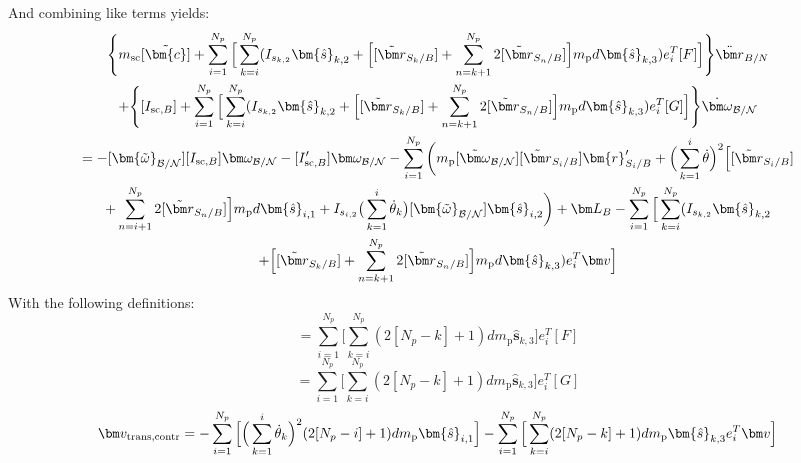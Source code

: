 And combining like terms yields:
\begin{multline}
	\Bigg \lbrace m_{\text{sc}} [\tilde{\bm{c}}] + \sum\limits_{i=1}^{N_p} \Big[\sum^{N_p}_{k=i} (I_{s_{k,2}} \bm{\hat{s}}_{k,2} + \Big[ [\tilde{{\bm r}}_{S_{k}/B}] + \sum\limits_{n=k+1}^{N_p}2[\tilde{{\bm r}}_{S_{n}/B}]\Big]m_{\text{p}} d \bm{\hat{s}}_{k,3} ) e_{i}^T[F] \Big] \Bigg \rbrace \ddot{\bm r}_{B/N} \\
	+ \Bigg \lbrace [I_{\text{sc},B}] + \sum\limits_{i=1}^{N_p} \Big[\sum^{N_p}_{k=i} (I_{s_{k,2}} \bm{\hat{s}}_{k,2} + \Big[ [\tilde{{\bm r}}_{S_{k}/B}] + \sum\limits_{n=k+1}^{N_p}2[\tilde{{\bm r}}_{S_{n}/B}]\Big]m_{\text{p}} d \bm{\hat{s}}_{k,3} ) e_{i}^T[G] \Big] \Bigg \rbrace \dot{\bm\omega}_{\cal B/N} \\
	= -[\bm{\tilde{\omega}}_{\cal B/N}] [I_{\text{sc},B}] \bm\omega_{\cal B/N} - [I'_{\text{sc},B}] \bm\omega_{\cal B/N} - \sum\limits_{i=1}^{N_p}\bigg( m_{\text{p}} [\tilde{\bm\omega}_{\cal B/N}] [\tilde{{\bm r}}_{S_{i}/B}] \bm{r}'_{S_i/B} + \Big( \sum\limits_{k=1}^{i} \dot{\theta}\Big)^2 \Big[[\tilde{{\bm r}}_{S_{i}/B}] \\
	+ \sum\limits_{n=i+1}^{N_p}2[\tilde{{\bm r}}_{S_{n}/B}]\Big] m_{\text{p}} d \bm{\hat{s}}_{i,1}
	+ I_{s_{i,2}} \big(\sum^{i}_{k=1}\dot{\theta}_k\big) [\bm{\tilde{\omega}}_{\cal B/N}] \bm{\hat{s}}_{i,2} \bigg) + \bm L_B - \sum\limits_{i=1}^{N_p} \Big[\sum^{N_p}_{k=i} (I_{s_{k,2}} \bm{\hat{s}}_{k,2} \\+ \Big[ [\tilde{{\bm r}}_{S_{k}/B}] + \sum\limits_{n=k+1}^{N_p}2[\tilde{{\bm r}}_{S_{n}/B}]\Big]m_{\text{p}} d \bm{\hat{s}}_{k,3} ) e_{i}^T \bm v \Big]
	\label{eq:Final8}
\end{multline}
With the following definitions:
\begin{equation}
	[A_{\text{contr}}] = \sum^{N_p}_{i=1} \Big[\sum^{N_p}_{k=i} (2[N_p-k]+1) d m_{\text{p}} \bm{\hat{s}}_{k,3}\Big] e_{i}^T[F]
\end{equation}
\begin{equation}
	[B_{\text{contr}}] =  \sum^{N_p}_{i=1} \Big[\sum^{N_p}_{k=i} (2[N_p-k]+1) d m_{\text{p}} \bm{\hat{s}}_{k,3}\Big] e_{i}^T[G]
\end{equation}
\begin{equation}
	\bm v_{\text{trans,contr}} = -\sum^{N_p}_{i=1} \Big[ \Big(\sum^{i}_{k=1}\dot{\theta}_k\Big)^2 (2[N_p-i]+1) d m_{\text{p}} \bm{\hat{s}}_{i,1} \Big]\\
	- \sum^{N_p}_{i=1} \Big[\sum^{N_p}_{k=i} (2[N_p-k]+1) d m_{\text{p}} \bm{\hat{s}}_{k,3} e_{i}^T \bm v \Big]
\end{equation}
